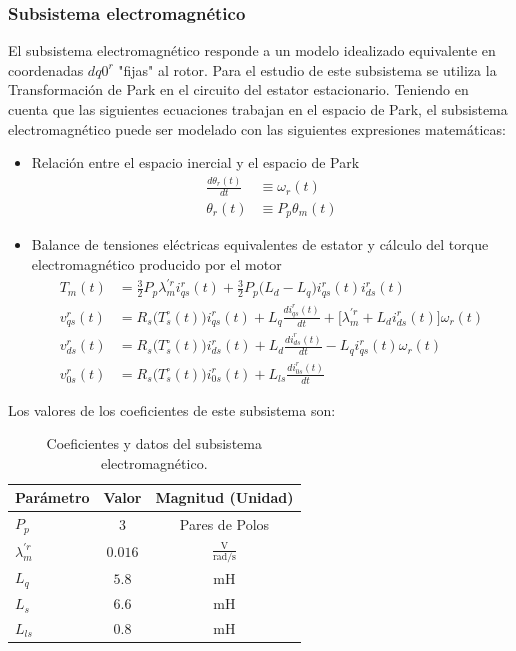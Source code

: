 \documentclass[blue,fullpaper]{ludusofficial}  %
\begin{document}
\subsubsection{Subsistema electromagnético}
El subsistema electromagnético responde a un modelo idealizado equivalente en coordenadas $dq0^r$ "fijas" al rotor. Para el estudio de este subsistema se utiliza la Transformación de Park en el circuito del estator estacionario. Teniendo en cuenta que las siguientes ecuaciones trabajan en el espacio de Park, el subsistema electromagnético puede ser modelado con las siguientes expresiones matemáticas:

\begin{itemize}
    \item Relación entre el espacio inercial y el espacio de Park
    \begin{align}
    \frac{d\theta_{r}(t)}{dt}  & \equiv \omega_{r}(t) \label{SubElec1}\\
    \theta_{r}(t)  & \equiv P_{p} \theta_{m}(t)  \label{SubElec2}
    \end{align}
    \item Balance de tensiones eléctricas equivalentes de estator y cálculo del torque electromagnético producido por el motor
    \begin{align}
        T_{m}(t) &  = \frac{3}{2}P_{p} \lambda_{m}^{'r} i_{qs}^{r}(t) + \frac{3}{2} P_{p} \Big( L_{d} - L_{q} \Big) i_{qs}^{r}(t) i_{ds}^{r}(t) \label{SubElec3} \\
        v_{qs}^{r}(t) & = R_{s} \Big( T_{s}^{\circ} (t) \Big) i_{qs}^{r}(t) + L_{q} \frac{di_{qs}^{r}(t)}{dt}  + \Big[ \lambda_{m}^{'r} + L_{d} i_{ds}^{r}(t) \Big] \omega_{r}(t)\label{SubElec4} \\
        v_{ds}^{r}(t) & = R_{s} \Big( T_{s}^{\circ} (t) \Big) i_{ds}^{r}(t) + L_{d} \frac{di_{ds}^{r}(t)}{dt} - L_{q}i_{qs}^{r}(t) \omega_{r}(t)   \label{SubElec5}\\
        v_{0s}^{r}(t) & = R_{s} \Big( T_{s}^{\circ} (t) \Big) i_{0s}^{r}(t) + L_{ls} \frac{di_{0s}^{r}(t)}{dt} \label{SubElec6}
    \end{align}
\end{itemize}

Los valores de los coeficientes de este subsistema son:

\begin{table}[htbp]
    \centering
    \caption{Coeficientes y datos del subsistema electromagnético.}
    \label{tab:parametros_carga}
    \begin{tabular}{lcc}
        \hline
        \textbf{Parámetro} & \textbf{Valor} & \textbf{Magnitud (Unidad)} \\
        \hline
        $P_p$ & $3$ & Pares de Polos \\
        $\lambda_{m}^{'r}$ & $0.016$ & $\mathrm{\frac{V}{rad/s}}$ \\
        $L_q$ & $5.8$ & $\mathrm{mH}$ \\
        $L_s$ & $6.6$ & $\mathrm{mH}$ \\
        $L_{ls}$ & $0.8$ & $\mathrm{mH}$ \\
        \hline
    \end{tabular}
\end{table}
\end{document}
